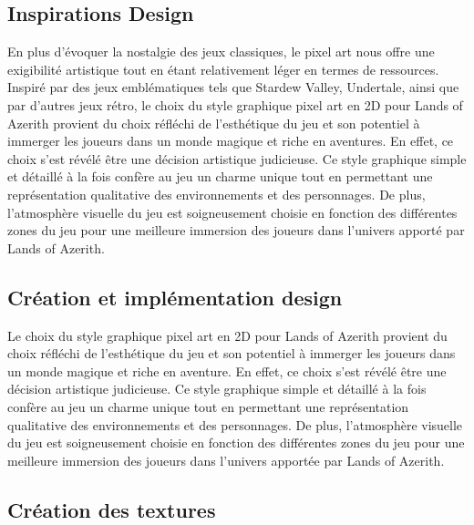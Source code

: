 

\subsection{Inspirations Design} %

En plus d'évoquer la nostalgie des jeux classiques, le pixel art nous offre une exigibilité artistique tout en étant relativement léger en termes de ressources.
Inspiré par des jeux emblématiques tels que Stardew Valley, Undertale, ainsi que par d'autres jeux rétro, le choix du style graphique pixel art en 2D pour Lands of Azerith provient du choix réfléchi de l'esthétique du jeu et son potentiel à immerger les joueurs dans un monde magique et riche en aventures.
En effet, ce choix s'est révélé être une décision artistique judicieuse.
Ce style graphique simple et détaillé à la fois confère au jeu un charme unique tout en permettant une représentation qualitative des environnements et des personnages.
De plus, l'atmosphère visuelle du jeu est soigneusement choisie en fonction des différentes zones du jeu pour une meilleure immersion des joueurs dans l'univers apporté par Lands of Azerith.
\\

\subsection{Création et implémentation design} %

Le choix du style graphique pixel art en 2D pour Lands of Azerith provient du choix réfléchi de l'esthétique du jeu et son potentiel à immerger les joueurs dans un monde magique et riche en aventure.
En effet, ce choix s'est révélé être une décision artistique judicieuse.
Ce style graphique simple et détaillé à la fois confère au jeu un charme unique tout en permettant une représentation qualitative des environnements et des personnages.
De plus, l'atmosphère visuelle du jeu est soigneusement choisie en fonction des différentes zones du jeu pour une meilleure immersion des joueurs dans l'univers apportée par Lands of Azerith.
\\

\subsection{Création des textures}


